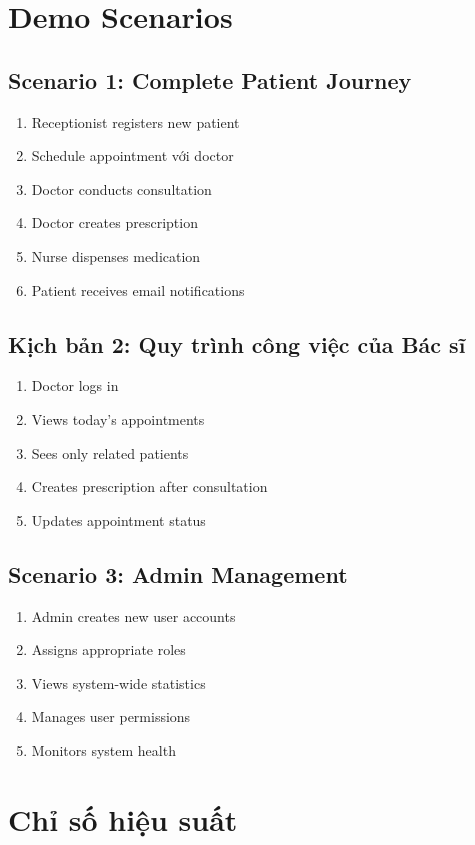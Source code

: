 \documentclass[12pt,a4paper]{report}
\begin{document}
\section{Demo Scenarios}

\subsection{Scenario 1: Complete Patient Journey}
\begin{enumerate}
    \item Receptionist registers new patient
    \item Schedule appointment với doctor
    \item Doctor conducts consultation
    \item Doctor creates prescription
    \item Nurse dispenses medication
    \item Patient receives email notifications
\end{enumerate}

\subsection{Kịch bản 2: Quy trình công việc của Bác sĩ}
\begin{enumerate}
    \item Doctor logs in
    \item Views today's appointments
    \item Sees only related patients
    \item Creates prescription after consultation
    \item Updates appointment status
\end{enumerate}

\subsection{Scenario 3: Admin Management}
\begin{enumerate}
    \item Admin creates new user accounts
    \item Assigns appropriate roles
    \item Views system-wide statistics
    \item Manages user permissions
    \item Monitors system health
\end{enumerate}

\section{Chỉ số hiệu suất}
\end{document}
